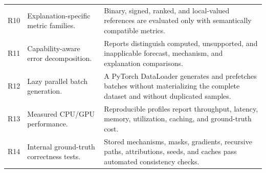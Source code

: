 \begin{longtable}{@{}
>{\raggedright\arraybackslash}p{}
>{\raggedright\arraybackslash}p{}
>{\raggedright\arraybackslash}p{}@{}}
R10 & Explanation-specific metric families. & Binary, signed, ranked, and local-valued references are evaluated only with semantically compatible metrics. \\
R11 & Capability-aware error decomposition. & Reports distinguish computed, unsupported, and inapplicable forecast, mechanism, and explanation comparisons. \\
R12 & Lazy parallel batch generation. & A PyTorch DataLoader generates and prefetches batches without materializing the complete dataset and without duplicated samples. \\
R13 & Measured CPU/GPU performance. & Reproducible profiles report throughput, latency, memory, utilization, caching, and ground-truth cost. \\
R14 & Internal ground-truth correctness tests. & Stored mechanisms, masks, gradients, recursive paths, attributions, seeds, and caches pass automated consistency checks. \\
\end{longtable}
\endgroup

\clearpage
